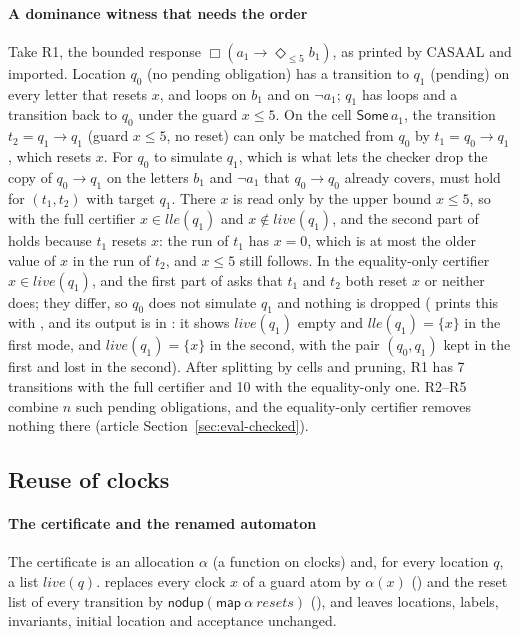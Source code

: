 \paragraph{A dominance witness that needs the order} Take R1, the bounded response $\Box(a_1\to\Diamond_{\le5}b_1)$, as printed by CASAAL and imported. Location $q_0$ (no pending obligation) has a transition to $q_1$ (pending) on every letter that resets $x$, and loops on $b_1$ and on $\neg a_1$; $q_1$ has loops and a transition back to $q_0$ under the guard $x\le5$. On the cell $\mathsf{Some}\,a_1$, the transition $t_2=q_1\to q_1$ (guard $x\le5$, no reset) can only be matched from $q_0$ by $t_1=q_0\to q_1$, which resets $x$. For $q_0$ to simulate $q_1$, which is what lets the checker drop the copy of $q_0\to q_1$ on the letters $b_1$ and $\neg a_1$ that $q_0\to q_0$ already covers,  must hold for $(t_1,t_2)$ with target $q_1$. There $x$ is read only by the upper bound $x\le5$, so with the full certifier $x\in\mathit{lle}(q_1)$ and $x\notin\mathit{live}(q_1)$, and the second part of  holds because $t_1$ resets $x$: the run of $t_1$ has $x=0$, which is at most the older value of $x$ in the run of $t_2$, and $x\le5$ still follows. In the equality-only certifier $x\in\mathit{live}(q_1)$, and the first part of  asks that $t_1$ and $t_2$ both reset $x$ or neither does; they differ, so $q_0$ does not simulate $q_1$ and nothing is dropped ( prints this with , and its output is in : it shows $\mathit{live}(q_1)$ empty and $\mathit{lle}(q_1)=\{x\}$ in the first mode, and $\mathit{live}(q_1)=\{x\}$ in the second, with the pair $(q_0,q_1)$ kept in the first and lost in the second). After splitting by cells and pruning, R1 has 7 transitions with the full certifier and 10 with the equality-only one. R2--R5 combine $n$ such pending obligations, and the equality-only certifier removes nothing there (article Section~\ref{sec:eval-checked}).

\subsection{Reuse of clocks}\label{sec:alloc-detail}
\paragraph{The certificate and the renamed automaton} The certificate is an allocation $\alpha$ (a function on clocks) and, for every location $q$, a list $\mathit{live}(q)$.  replaces every clock $x$ of a guard atom by $\alpha(x)$ () and the reset list of every transition by $\mathsf{nodup}(\mathsf{map}\ \alpha\ \mathit{resets})$ (), and leaves locations, labels, invariants, initial location and acceptance unchanged.

